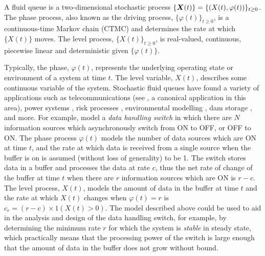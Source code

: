 		

A fluid queue is a two-dimensional stochastic process \(\{{\boldsymbol X}(t)\} = \{( X(t),\varphi(t))\}_{t\geq0}\). The phase process, also known as the driving process, \(\{\varphi(t)\}_{t\geq0}\), is a continuous-time Markov chain (CTMC) and determines the rate at which \(\{ X(t)\}\) moves. The level process, \(\{ X(t)\}_{t\geq0}\), is real-valued, continuous, piecewise linear and deterministic given \(\{\varphi(t)\}\). 

Typically, the phase, \(\varphi(t)\), represents the underlying operating state or environment of a system at time \(t\). The level variable, \(X(t)\), describes some continuous variable of the system. Stochastic fluid queues have found a variety of applications such as telecommunications (see \cite{anick1982}, a canonical application in this area), power systems \citep{hydro}, risk processes \citep{betal2005}, environmental modelling \citep{wurm2020}, dam storage \citep{loynes1962}, and more. For example, \cite{anick1982} model a \emph{data handling switch} in which there are \(N\) information sources which asynchronously switch from ON to OFF, or OFF to ON. The phase process \(\varphi(t)\) models the number of data sources which are ON at time \(t\), and the rate at which data is received from a single source when the buffer is on is assumed (without loss of generality) to be 1. The switch stores data in a buffer and processes the data at rate \(c\), thus the net rate of change of the buffer at time \(t\) when there are \(r\) information sources which are ON is \(r-c\). The level process, \(X(t)\), models the amount of data in the buffer at time \(t\) and the rate at which \(X(t)\) changes when \(\varphi(t)=r\) is \(c_r=(r-c)\times 1(X(t)>0)\). The model described above could be used to aid in the analysis and design of the data handling switch, for example, by determining the minimum rate \(r\) for which the system is \emph{stable} in steady state, which practically means that the processing power of the switch is large enough that the amount of data in the buffer does not grow without bound. 


